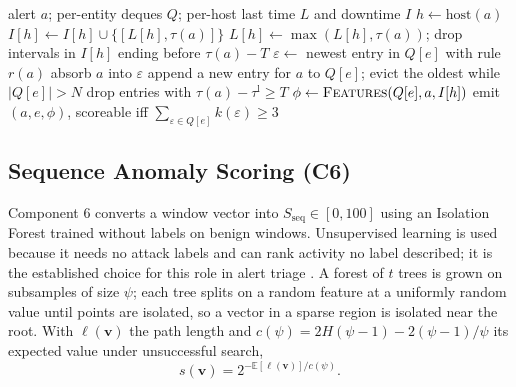 \documentclass[conference]{IEEEtran}
\begin{document}
\begin{algorithm}[t]
\caption{Online window construction for one admitted alert}
\label{alg:window}
\begin{algorithmic}[1]
\Require alert $a$; per-entity deques $Q$; per-host last time $L$ and downtime $I$
\State $h \gets \mathrm{host}(a)$ 
 \State $I[h] \gets I[h] \cup \{[L[h], \tau(a)]\}$ \EndIf
\State $L[h] \gets \max(L[h], \tau(a))$; drop intervals in $I[h]$ ending before $\tau(a) - T$
 \Return \EndIf
{}
  \State $\varepsilon \gets$ newest entry in $Q[e]$ with rule $r(a)$
   \State absorb $a$ into $\varepsilon$
  \Else \State append a new entry for $a$ to $Q[e]$; evict the oldest while $|Q[e]| > N$ \EndIf
  \State drop entries with $\tau(a) - \tau^{\mathrm{l}} \ge T$
  \State $\phi \gets \textsc{Features}(Q[e], a, I[h])$ 
  \State emit $(a, e, \phi)$, scoreable iff $\sum_{\varepsilon \in Q[e]} k(\varepsilon) \ge 3$
\EndFor
\end{algorithmic}
\end{algorithm}

\subsection{Sequence Anomaly Scoring (C6)}
\label{sec:iforest}

Component 6 converts a window vector into $S_\mathrm{seq} \in [0,100]$ using an Isolation Forest \cite{ref20} trained without labels on benign windows. Unsupervised learning is used because it needs no attack labels and can rank activity no label described; it is the established choice for this role in alert triage \cite{ref5}. A forest of $t$ trees is grown on subsamples of size $\psi$; each tree splits on a random feature at a uniformly random value until points are isolated, so a vector in a sparse region is isolated near the root. With $\ell(\mathbf{v})$ the path length and $c(\psi) = 2H(\psi - 1) - 2(\psi - 1)/\psi$ its expected value under unsuccessful search,
\begin{equation}
s(\mathbf{v}) = 2^{-\mathbb{E}[\ell(\mathbf{v})] / c(\psi)} .
\end{equation}
\end{document}
